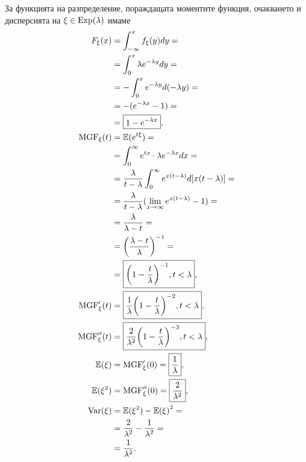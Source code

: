 \documentclass[numbers=endperiod, bibliography=totocnumbered]{scrartcl}
\begin{document}
За функцията на разпределение, пораждащата моментите функция, очакването и дисперсията на \( \xi \in \operatorname{Exp}(\lambda) \) имаме
\begingroup
\allowdisplaybreaks
\begin{align*}
  F_\xi(x)
  &=
  \int_{-\infty}^x f_\xi(y) dy
  = \\ &=
  \int_0^x \lambda e^{-\lambda y} dy
  = \\ &=
  -\int_0^x e^{-\lambda y} d(-\lambda y)
  = \\ &=
  -(e^{-\lambda x} - 1)
  = \\ &=
  \boxed{1 - e^{-\lambda x}},
  \\
  \operatorname{MGF}_\xi(t)
  &=
  \mathbb{E}(e^{t\xi})
  = \\ &=
  \int_0^\infty e^{tx} \cdot \lambda e^{-\lambda x} dx
  = \\ &=
  \frac \lambda {t-\lambda} \int_0^\infty e^{x(t-\lambda)} d[x(t-\lambda)]
  = \\ &=
  \frac \lambda {t-\lambda} (\lim_{x \to \infty} e^{x(t-\lambda)} - 1)
  = \\ &=
  \frac \lambda {\lambda-t}
  = \\ &=
  {\left(\frac {\lambda-t} \lambda \right)}^{-1}
  = \\ &=
  \boxed{{\left(1 - \frac t \lambda \right)}^{-1}, t < \lambda},
  \\
  \operatorname{MGF}'_\xi(t)
  &=
  \boxed{\frac 1 \lambda {\left(1 - \frac t \lambda \right)}^{-2}, t < \lambda},
  \\
  \operatorname{MGF}''_\xi(t)
  &=
  \boxed{\frac 2 {\lambda^2} {\left(1 - \frac t \lambda \right)}^{-3}, t < \lambda},
  \\
  \mathbb{E}(\xi)
  &=
  \operatorname{MGF}'_\xi(0)
  =
  \boxed{\frac 1 \lambda},
  \\
  \mathbb{E}(\xi^2)
  &=
  \operatorname{MGF}''_\xi(0)
  =
  \boxed{\frac 2 {\lambda^2}},
  \\
  \operatorname{Var}(\xi)
  &=
  \mathbb{E}(\xi^2) - {\mathbb{E}(\xi)}^2
  = \\ &=
  \frac 2 {\lambda^2} - \frac 1 {\lambda^2}
  = \\ &=
  \frac 1 {\lambda^2}.
\end{align*}
\endgroup
\end{document}
